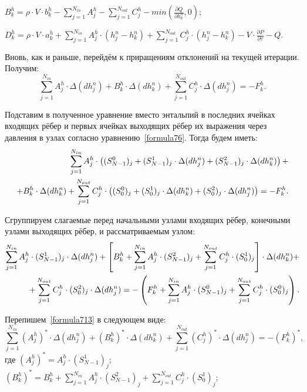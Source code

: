 \noindent $B_k^h=\rho\cdot V\cdot b_k^h - \sum_{j=1}^{N_{in}} A_j^h - \sum_{j=1}^{N_{out}} C_j^h - min\left(\frac{\partial Q}{\partial h_k^n},0 \right)$;

\noindent $D_k^h=\rho\cdot V\cdot a_k^h+\sum_{j=1}^{N_{in}} A_j^h \cdot (h_j^n-h_k^n) + \sum_{j=1}^{N_{out}} C_j^h \cdot (h_j^n-h_k^n)-V\cdot\frac{\partial P}{\partial\tau} - Q$.

\vspace{12pt}
Вновь, как и раньше, перейдём к приращениям отклонений на текущей итерации. Получим:
\begin{equation}
\label{formula711}
\sum_{j=1}^{N_{in}} A_j^h \cdot \Delta(dh_j^n) + B_k^h \cdot \Delta(dh_k^n) + \sum_{j=1}^{N_{out}} C_j^h \cdot \Delta(dh_j^n) = -F_k^h. 
\end{equation}

Подставим в полученное уравнение вместо энтальпий в последних ячейках входящих рёбер и первых ячейках выходящих рёбер их выражения через давления в узлах согласно уравнению~\eqref{formula76}. Тогда будем иметь:
\begin{align}
\label{formula712}
\sum_{j=1}^{N_{in}} A_j^h \cdot \left((S_{N-1}^0)_j+(S_{N-1}^1)_j \cdot \Delta(dh_j^n) + (S_{N-1}^2)_j \cdot \Delta(dh_k^n)\right) + \notag \\
+ B_k^h \cdot \Delta(dh_k^n) + \sum_{j=1}^{N_{out}} C_j^h \cdot \left((S_0^0)_j+(S_0^1)_j \cdot \Delta(dh_k^n) + (S_0^2)_j \cdot \Delta(dh_j^n)    \right) = -F_k^h. 
\end{align}

Сгруппируем слагаемые перед начальными узлами входящих рёбер, конечными узлами выходящих рёбер, и рассматриваемым узлом:
\begin{align}
\label{formula713}
\sum_{j=1}^{N_{in}} A_j^h \cdot (S_{N-1}^1)_j \cdot \Delta(dh_j^n) + \left[B_k^h + \sum_{j=1}^{N_{in}} A_j^h \cdot (S_{N-1}^2)_j + \sum_{j=1}^{N_{out}} C_j^h \cdot (S_0^1)_j \right] \cdot \Delta(dh_k^n) + \notag \\
+ \sum_{j=1}^{N_{out}} C_j^h \cdot (S_0^2)_j \cdot \Delta(dh_j^n) = -\left(F_k^h+\sum_{j=1}^{N_{in}} A_j^h \cdot (S_{N-1}^0)_j + \sum_{j=1}^{N_{out}} C_j^h \cdot (S_0^0)_j\right).  
\end{align}

Перепишем~\eqref{formula713} в следующем виде:
\begin{equation}
\label{formula714}
\sum_{j=1}^{N_{in}} (A_j^h)^{*} \cdot \Delta(dh_j^n) + (B_k^h)^{*} \cdot \Delta(dh_k^n) + \sum_{j=1}^{N_{out}} (C_j^h)^{*} \cdot \Delta(dh_j^n) = -(F_k^h)^{*}, 
\end{equation}
где $(A_j^h)^{*} = A_j^h \cdot (S_{N-1}^1)_j$; $(B_k^h)^{*} = B_k^h + \sum_{j=1}^{N_{in}} A_j^h \cdot (S_{N-1}^2)_j + \sum_{j=1}^{N_{out}} C_j^h \cdot (S_0^1)_j$;

